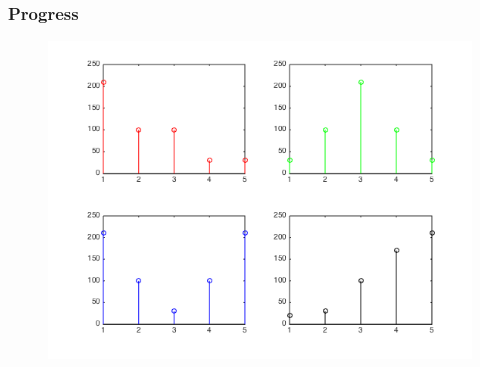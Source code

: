\documentclass{beamer}
\begin{document}
\begin{frame}
    \frametitle{Progress}

    \begin{figure}[H]
        \centering
        \includegraphics[scale=0.3]{toyImageProfiles.png}
    \end{figure}


\end{frame}
\end{document}

